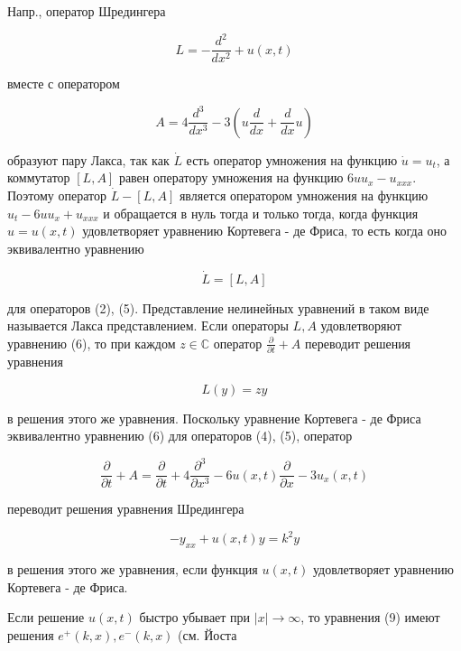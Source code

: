 \documentclass[10pt]{article}
\begin{document}
Напр., оператор Шредингера



\[

L=-\frac{d^{2}}{d x^{2}}+u(x, t)

\]



вместе с оператором



\[

A=4 \frac{d^{3}}{d x^{3}}-3\left(u \frac{d}{d x}+\frac{d}{d x} u\right)

\]



образуют пару Лакса, так как $\dot{L}$ есть оператор умножения на функцию $\dot{u}=u_{t}$, а коммутатор $[L, A]$ равен оператору умножения на функцию $6 u u_{x}-u_{x x x}$. Поэтому оператор $\dot{L}-[L, A]$ является оператором умножения на функцию $u_{t}-6 u u_{x}+u_{x x x}$ и обращается в нуль тогда и только тогда, когда функция $u=u(x, t)$ удовлетворяет уравнению Кортевега - де Фриса, то есть когда оно эквивалентно уравнению



\[

\dot{L}=[L, A]

\]



для операторов (2), (5). Представление нелинейных уравнений в таком виде называется Лакса представлением. Если операторы $L, A$ удовлетворяют уравнению (6), то при каждом $z \in \mathbb{C}$ оператор $\frac{\partial}{\partial t}+A$ переводит решения уравнения



\[

L(y)=z y

\]



в решения этого же уравнения. Поскольку уравнение Кортевега - де Фриса эквивалентно уравнению (6) для операторов (4), (5), оператор



\[

\frac{\partial}{\partial t}+A=\frac{\partial}{\partial t}+4 \frac{\partial^{3}}{\partial x^{3}}-6 u(x, t) \frac{\partial}{\partial x}-3 u_{x}(x, t)

\]



переводит решения уравнения Шредингера



\[

-y_{x x}+u(x, t) y=k^{2} y

\]



в решения этого же уравнения, если функция $u(x, t)$ удовлетворяет уравнению Кортевега - де Фриса.



Если решение $u(x, t)$ быстро убывает при $|x| \rightarrow \infty$, то уравнения (9) имеют решения $e^{+}(k, x), e^{-}(k, x)$ (см. Йоста
\end{document}
